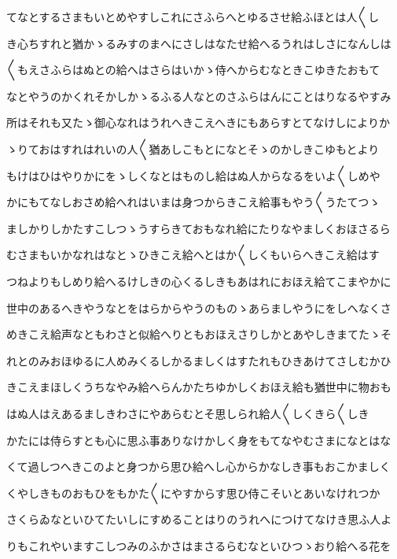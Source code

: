 \documentclass[a4paper,11pt,landscape]{ltjtarticle}
\begin{document}
\par\medskip
てなとするさまもいとめやすしこれにさふらへとゆるさせ給ふほとは人〱し
\par\medskip
き心ちすれと猶かゝるみすのまへにさしはなたせ給へるうれはしさになんしは
\par\medskip
〱もえさふらはぬとの給へはさらはいかゝ侍へからむなときこゆきたおもて
\par\medskip
なとやうのかくれそかしかゝるふる人なとのさふらはんにことはりなるやすみ
\par\medskip
所はそれも又たゝ御心なれはうれへきこえへきにもあらすとてなけしによりか
\par\medskip
ゝりておはすれはれいの人〱猶あしこもとになとそゝのかしきこゆもとより
\par\medskip
もけはひはやりかにをゝしくなとはものし給はぬ人からなるをいよ〱しめや
\par\medskip
かにもてなしおさめ給へれはいまは身つからきこえ給事もやう〱うたてつゝ
\par\medskip
ましかりしかたすこしつゝうすらきておもなれ給にたりなやましくおほさるら
\par\medskip
むさまもいかなれはなとゝひきこえ給へとはか〱しくもいらへきこえ給はす
\par\medskip
つねよりもしめり給へるけしきの心くるしきもあはれにおほえ給てこまやかに
\par\medskip
世中のあるへきやうなとをはらからやうのものゝあらましやうにをしへなくさ
\par\medskip
めきこえ給声なともわさと似給へりともおほえさりしかとあやしきまてたゝそ
\par\medskip
れとのみおほゆるに人めみくるしかるましくはすたれもひきあけてさしむかひ
\par\medskip
きこえまほしくうちなやみ給へらんかたちゆかしくおほえ給も猶世中に物おも
\par\medskip
はぬ人はえあるましきわさにやあらむとそ思しられ給人〱しくきら〱しき
\par\medskip
かたには侍らすとも心に思ふ事ありなけかしく身をもてなやむさまになとはな
\par\medskip
くて過しつへきこのよと身つから思ひ給へし心からかなしき事もおこかましく
\par\medskip
くやしきものおもひをもかた〱にやすからす思ひ侍こそいとあいなけれつか
\par\medskip
さくらゐなといひてたいしにすめることはりのうれへにつけてなけき思ふ人よ
\par\medskip
りもこれやいますこしつみのふかさはまさるらむなといひつゝおり給へる花を
\par\medskip
\end{document}

